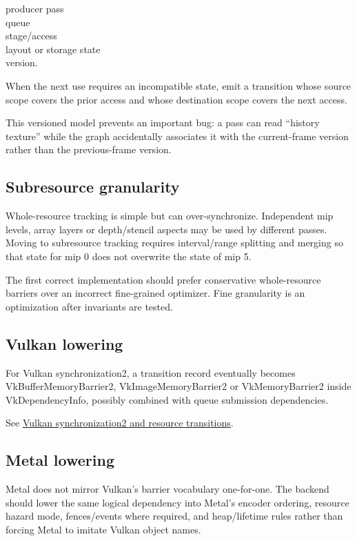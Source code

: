 producer pass\\
queue\\
stage/access\\
layout or storage state\\
version.

When the next use requires an incompatible state, emit a transition whose source scope covers the prior access and whose destination scope covers the next access.

This versioned model prevents an important bug: a pass can read ``history texture'' while the graph accidentally associates it with the current-frame version rather than the previous-frame version.

\subsection{Subresource granularity}\label{subresource-granularity}

Whole-resource tracking is simple but can over-synchronize. Independent mip levels, array layers or depth/stencil aspects may be used by different passes. Moving to subresource tracking requires interval/range splitting and merging so that state for mip 0 does not overwrite the state of mip 5.

The first correct implementation should prefer conservative whole-resource barriers over an incorrect fine-grained optimizer. Fine granularity is an optimization after invariants are tested.

\subsection{Vulkan lowering}\label{vulkan-lowering}

For Vulkan synchronization2, a transition record eventually becomes VkBufferMemoryBarrier2, VkImageMemoryBarrier2 or VkMemoryBarrier2 inside VkDependencyInfo, possibly combined with queue submission dependencies.

See \hyperref[appendix-f15ce0d9c170]{Vulkan synchronization2 and resource transitions}.

\subsection{Metal lowering}\label{metal-lowering}

Metal does not mirror Vulkan's barrier vocabulary one-for-one. The backend should lower the same logical dependency into Metal's encoder ordering, resource hazard mode, fences/events where required, and heap/lifetime rules rather than forcing Metal to imitate Vulkan object names.

